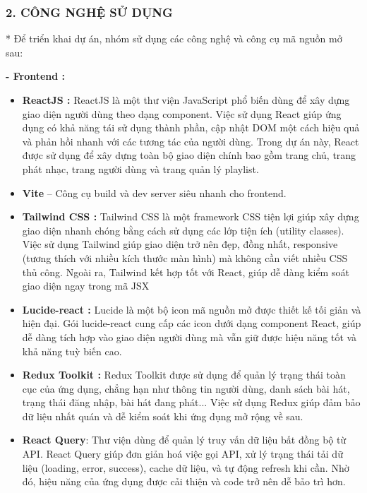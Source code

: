 \documentclass{article}
\begin{document}
\subsubsection{}\label{section-1}

\subsubsection{\texorpdfstring{\textbf{2. CÔNG NGHỆ SỬ
DỤNG}}{2. CÔNG NGHỆ SỬ DỤNG}}\label{cuxf4ng-nghux1ec7-sux1eed-dux1ee5ng}

* Để triển khai dự án, nhóm sử dụng các công nghệ và công cụ mã nguồn mở
sau:

\textbf{- Frontend :}

\begin{itemize}
\item
  \textbf{ReactJS :} ReactJS là một thư viện JavaScript phổ biến dùng để
  xây dựng giao diện người dùng theo dạng component. Việc sử dụng React
  giúp ứng dụng có khả năng tái sử dụng thành phần, cập nhật DOM một
  cách hiệu quả và phản hồi nhanh với các tương tác của người dùng.
  Trong dự án này, React được sử dụng để xây dựng toàn bộ giao diện
  chính bao gồm trang chủ, trang phát nhạc, trang người dùng và trang
  quản lý playlist.
\item
  \textbf{Vite} -- Công cụ build và dev server siêu nhanh cho frontend.
\item
  \textbf{Tailwind CSS :} Tailwind CSS là một framework CSS tiện lợi
  giúp xây dựng giao diện nhanh chóng bằng cách sử dụng các lớp tiện ích
  (utility classes). Việc sử dụng Tailwind giúp giao diện trở nên đẹp,
  đồng nhất, responsive (tương thích với nhiều kích thước màn hình) mà
  không cần viết nhiều CSS thủ công. Ngoài ra, Tailwind kết hợp tốt với
  React, giúp dễ dàng kiểm soát giao diện ngay trong mã JSX
\item
  \textbf{Lucide-react :} Lucide là một bộ icon mã nguồn mở được thiết
  kế tối giản và hiện đại. Gói lucide-react cung cấp các icon dưới dạng
  component React, giúp dễ dàng tích hợp vào giao diện người dùng mà vẫn
  giữ được hiệu năng tốt và khả năng tuỳ biến cao.
\item
  \textbf{Redux Toolkit :} Redux Toolkit được sử dụng để quản lý trạng
  thái toàn cục của ứng dụng, chẳng hạn như thông tin người dùng, danh
  sách bài hát, trạng thái đăng nhập, bài hát đang phát... Việc sử dụng
  Redux giúp đảm bảo dữ liệu nhất quán và dễ kiểm soát khi ứng dụng mở
  rộng về sau.
\item
  \textbf{React Query}: Thư viện dùng để quản lý truy vấn dữ liệu bất
  đồng bộ từ API. React Query giúp đơn giản hoá việc gọi API, xử lý
  trạng thái tải dữ liệu (loading, error, success), cache dữ liệu, và tự
  động refresh khi cần. Nhờ đó, hiệu năng của ứng dụng được cải thiện và
  code trở nên dễ bảo trì hơn.
\end{itemize}
\end{document}
